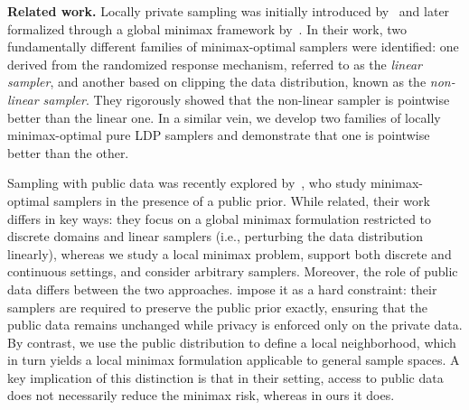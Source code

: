 \documentclass[accepted]{article}
\theoremstyle{plain} %
\theoremstyle{definition}
\theoremstyle{remark}
\newcommand{\eps}{\varepsilon}
\newcommand{\SA}[1]{\textbf{\textcolor{Magenta}{[#1]}}}
\newcommand{\HG}[1]{\textcolor{cyan}{[#1]}}
\begin{document}
\textbf{Related work.}
Locally private sampling was initially introduced by~\citet{husain2020local} and later formalized through a global minimax framework by~\citet{park2024exactly}. In their work, two fundamentally different families of minimax-optimal samplers were identified: one derived from the randomized response mechanism, referred to as the \emph{linear sampler}, and another based on clipping the data distribution, known as the \emph{non-linear sampler}. They rigorously showed that the non-linear sampler is pointwise better than the linear one. In a similar vein, we develop two families of locally minimax-optimal pure LDP samplers and demonstrate that one is pointwise better than the other.

Sampling with public data was recently explored by~\citet{zamanlooy2024locally}, who study minimax-optimal samplers in the presence of a public prior. While related, their work differs in key ways: they focus on a global minimax formulation restricted to discrete domains and linear samplers (i.e., perturbing the data distribution linearly), whereas we study a local minimax problem, support both discrete and continuous settings, and consider arbitrary samplers. Moreover, the role of public data differs between the two approaches. \citet{zamanlooy2024locally} impose it as a hard constraint: their samplers are required to preserve the public prior exactly, ensuring that the public data remains unchanged while privacy is enforced only on the private data. By contrast, we use the public distribution to define a local neighborhood, which in turn yields a local minimax formulation applicable to general sample spaces. A key implication of this distinction is that in their setting, access to public data does not necessarily reduce the minimax risk, whereas in ours it does.
\end{document}

